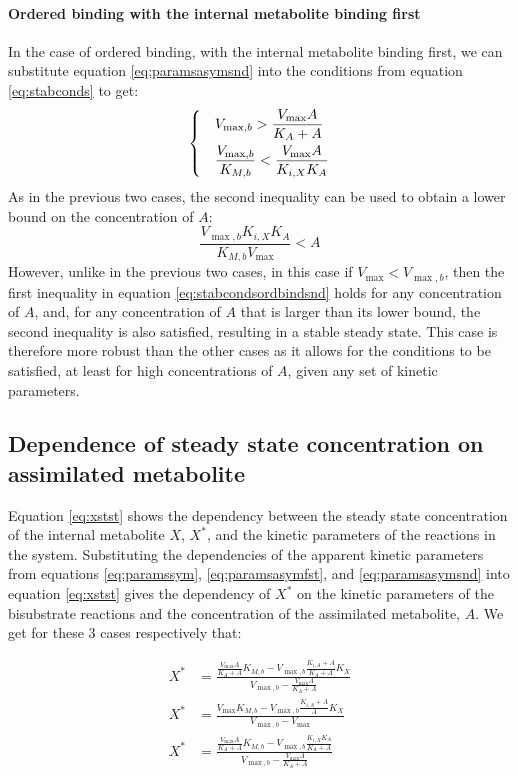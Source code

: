   \paragraph{Ordered binding with the internal metabolite binding first}
  In the case of ordered binding, with the internal metabolite binding first, we can substitute equation \ref{eq:paramsasymsnd} into the conditions from equation \ref{eq:stabconds} to get:
  \begin{equation}
    \label{eq:stabcondsordbindsnd}
    \begin{dcases}
      & V_{\max,b}>\frac{V_{\max}A}{K_A+A} \\
      & \frac{V_{\max,b}}{K_{M,b}}<\frac{V_{\max}A}{K_{i,X}K_A}
    \end{dcases}
  \end{equation}
  As in the previous two cases, the second inequality can be used to obtain a lower bound on the concentration of $A$:
  \begin{equation}
      \label{eq:assimlowerboundasym}
    \frac{V_{\max,b}K_{i,X}K_A}{K_{M,b}V_{\max}}<A
  \end{equation}
  However, unlike in the previous two cases, in this case if $V_{\max}<V_{\max,b}$, then the first inequality in equation \ref{eq:stabcondsordbindsnd} holds for any concentration of $A$, and, for any concentration of $A$ that is larger than its lower bound, the second inequality is also satisfied, resulting in a stable steady state.
  This case is therefore more robust than the other cases as it allows for the conditions to be satisfied, at least for high concentrations of $A$, given any set of kinetic parameters.
  \label{sec:bisubstrateconstraints}
  \subsection{Dependence of steady state concentration on assimilated metabolite}
  Equation \ref{eq:xstst} shows the dependency between the steady state concentration of the internal metabolite $X$, $X^*$, and the kinetic parameters of the reactions in the system.
  Substituting the dependencies of the apparent kinetic parameters from equations \ref{eq:paramssym}, \ref{eq:paramsasymfst}, and \ref{eq:paramsasymsnd} into equation \ref{eq:xstst} gives the dependency of $X^*$ on the kinetic parameters of the bisubstrate reactions and the concentration of the assimilated metabolite, $A$.
  We get for these 3 cases respectively that:

  \begin{align}
      X^* &= \frac{\frac{V_{\max}A}{K_A+A}K_{M,b}-V_{\max,b}\frac{K_{i,A}+A}{K_A+A}K_X}
      {V_{\max,b}-\frac{V_{\max}A}{K_A+A}} \label{eq:xststrand} \\
      X^* &= \frac{V_{\max}K_{M,b}-V_{\max,b}\frac{K_{i,A}+A}{A}K_X}
      {V_{\max,b}-V_{\max}}\label{eq:xststordfst} \\
      X^* &= \frac{\frac{V_{\max}A}{K_A+A}K_{M,b}-V_{\max,b}\frac{K_{i,X}K_A}{K_A+A} }
      { V_{\max,b}-\frac{V_{\max}A}{K_A+A} }\label{eq:xststordsnd}
  \end{align}

